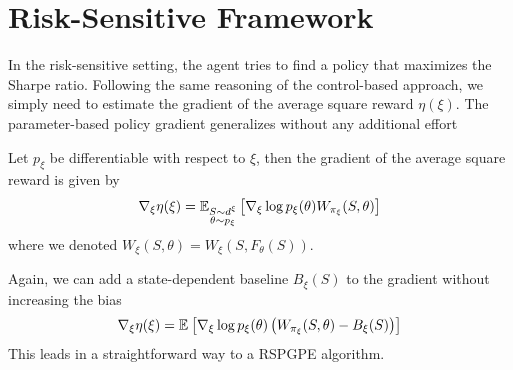 \section{Risk-Sensitive Framework}
In the risk-sensitive setting, the agent tries to find a policy that maximizes the Sharpe ratio. Following the same reasoning of the control-based approach, we simply need to estimate the gradient of the average square reward $\eta(\xi)$. The parameter-based policy gradient generalizes without any additional effort
\begin{theorem}
	Let $p_\xi$ be differentiable with respect to $\xi$, then the gradient of the average square reward is given by
	\begin{equation}
		\nabla_\xi \eta(\xi) = \E[\substack{S \sim d^\xi\\\theta \sim p_\xi}]{\nabla_\xi \log p_\xi(\theta) W_{\pi_\xi}(S, \theta)}
	\end{equation}
	where we denoted $W_\xi(S, \theta) = W_\xi(S, F_\theta(S))$.
\end{theorem}
Again, we can add a state-dependent baseline $B_\xi(S)$ to the gradient without increasing the bias
\begin{equation}
	\nabla_\xi \eta(\xi) = \E{\nabla_\xi \log p_\xi(\theta) \left(W_{\pi_\xi}(S,
						\theta) - B_\xi(S)\right)}
\end{equation}
This leads in a straightforward way to a \gls{RSPGPE} algorithm.

